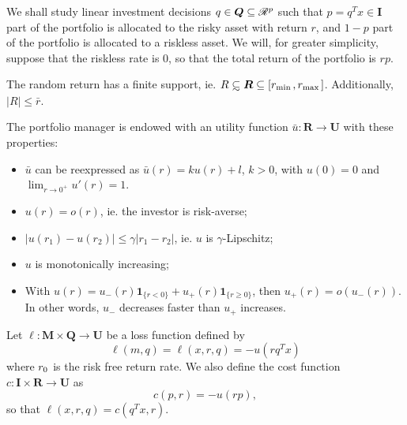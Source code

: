 \documentclass[10pt]{article}
\begin{document}
We shall study linear investment decisions $q\in\bm Q\subseteq\mathscr{R}^p$ such that
$p=q^Tx\in\bm I$ part of the portfolio is allocated to the risky asset with return $r$,
and $1-p$ part of the portfolio is allocated to a riskless asset. We will, for greater
simplicity, suppose that the riskless rate is $0$, so that the total return of the
portfolio is $rp$. 



\begin{assumption}
  The random return has a finite support, ie.
  $R\subsetsim \bm R \subseteq [r_{\min{}},r_{\max{}}]$. Additionally, $|R|\leq \bar r$.
\end{assumption}

\begin{assumption}
  The portfolio manager is endowed with an utility function $\bar u:\bm R\to \bm U$ with
  these properties:
  \begin{itemize}[noitemsep,topsep=0pt]
  \item $\bar u$ can be reexpressed as $\bar u(r) = ku(r) + l$, $k>0$, with $u(0) = 0$ and
    $\lim_{r\to0^+}u'(r) = 1$.
  \item $u(r) = o(r)$, ie. the investor is risk-averse;
  \item $|u(r_1) - u(r_2)| \leq \gamma|r_1-r_2|$, ie. $u$ is $\gamma$-Lipschitz;
  \item $u$ is monotonically increasing;
  \item With $u(r) = u_-(r)\bm1_{\{r<0\}}+u_+(r)\bm 1_{\{r\geq0\}}$, then $u_+(r) =
    o(u_-(r))$. In other words, $u_-$ decreases faster than $u_+$ increases. 
  \end{itemize}
\end{assumption}

\begin{deff}
  Let $\ell:\bm M\times \bm Q\to\bm U$ be a loss function defined by
  \[
    \ell(m,q) = \ell(x,r,q) = -u(rq^Tx)
  \]
  where $r_0$ is the risk free return rate. We also define the cost function
  $c:\bm I\times\bm R\to\bm U$ as
  \[
    c(p,r) = -u(rp),
  \]
  so that $\ell(x,r,q) = c(q^Tx,r)$. 
\end{deff}
\end{document}
